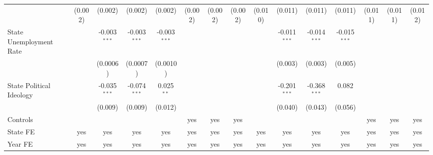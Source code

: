 \documentclass[
]{article}
\begin{document}
\begin{landscape}
\begin{table}[htbp]
\begin{adjustbox}{width = 1.5\textwidth, center}
\begin{threeparttable}[b]
\begin{tabular}{lcccccccccccccc}
                                                      & (0.002)        & (0.002)        & (0.002)        & (0.002)        & (0.002)        & (0.002)        & (0.002)        & (0.010)        & (0.011)        & (0.011)        & (0.011)        & (0.011)       & (0.011)       & (0.012)\\   
            State Unemployment Rate                   &                & -0.003$^{***}$ & -0.003$^{***}$ & -0.003$^{***}$ &                &                &                &                & -0.011$^{***}$ & -0.014$^{***}$ & -0.015$^{***}$ &               &               &   \\   
                                                      &                & (0.0006)       & (0.0007)       & (0.0010)       &                &                &                &                & (0.003)        & (0.003)        & (0.005)        &               &               &   \\   
            State Political Ideology                  &                & -0.035$^{***}$ & -0.074$^{***}$ & 0.025$^{**}$   &                &                &                &                & -0.201$^{***}$ & -0.368$^{***}$ & 0.082          &               &               &   \\   
                                                      &                & (0.009)        & (0.009)        & (0.012)        &                &                &                &                & (0.040)        & (0.043)        & (0.056)        &               &               &   \\   
            \midrule 
            Controls                                  &                &                &                &                & yes            & yes            & yes            &                &                &                &                & yes           & yes           & yes\\  
            State FE                                  & yes            & yes            & yes            & yes            & yes            & yes            & yes            & yes            & yes            & yes            & yes            & yes           & yes           & yes\\  
            Year FE                                   & yes            & yes            & yes            & yes            & yes            & yes            & yes            & yes            & yes            & yes            & yes            & yes           & yes           & yes\\  

\end{tabular}
\end{threeparttable}
\end{adjustbox}
\end{table}
\end{landscape}
\end{document}
